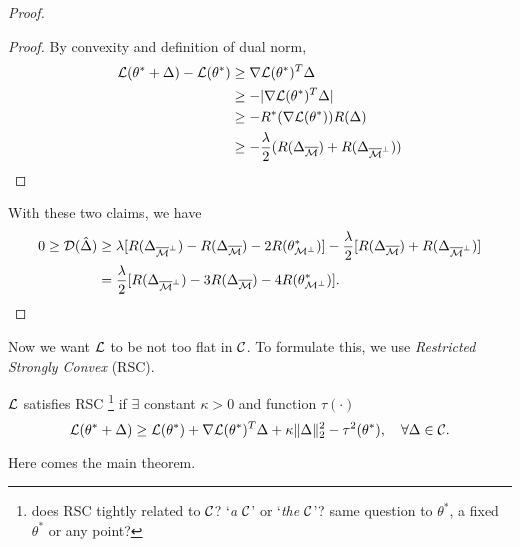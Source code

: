 \begin{proof}
    \begin{proof}
        By convexity and definition of dual norm,
        \begin{align}
            \mathcal{L}(\theta^*+\Delta)-\mathcal{L}(\theta^*) & \ge \nabla\mathcal{L}(\theta^*)^T\Delta \\
                & \ge-|\nabla\mathcal{L}(\theta^*)^T\Delta| \\
                & \ge -R^*(\nabla\mathcal{L}(\theta^*))R(\Delta)    \\
                & \ge -\frac{\lambda}{2}(R(\Delta_{{\overline{\mathcal{M}}}})+R(\Delta_{{\overline{\mathcal{M}}}^\perp}))
        \end{align}
    \end{proof}

    With these two claims, we have
    \begin{equation}
    \begin{split}
    0 \ge \mathcal{D}({\hat\Delta}) & \ge \lambda[R(\Delta_{{\overline{\mathcal{M}}}^\perp})-R(\Delta_{{\overline{\mathcal{M}}}})-2R(\theta^*_{\mathcal{M}^\perp})]
        -\frac{\lambda}{2}[R(\Delta_{{\overline{\mathcal{M}}}})+R(\Delta_{{\overline{\mathcal{M}}}^\perp})]  \\
    & = \frac{\lambda}{2}[R(\Delta_{{\overline{\mathcal{M}}}^\perp})-3R(\Delta_{{\overline{\mathcal{M}}}})-4R(\theta^*_{\mathcal{M}^\perp})].
    \end{split}
    \end{equation}
\end{proof}

Now we want $\mathcal{L}$ to be not too flat in $\mathcal{C}$.
To formulate this, we use \emph{Restricted Strongly Convex} (RSC).

\begin{define}
    $\mathcal{L}$ satisfies RSC
    \footnote{does RSC tightly related to $\mathcal{C}$? \ie `\emph{a} $\mathcal{C}$' or `\emph{the} $\mathcal{C}$'?
    same question to $\theta^*$, a fixed $\theta^*$ or any point?}
    if $\exists$ constant $\kappa > 0$ and function $\tau(\cdot)$
    \st
    \begin{equation}
        \mathcal{L}(\theta^*+\Delta)\ge \mathcal{L}(\theta^*) + \nabla \mathcal{L}(\theta^*)^T\Delta + \kappa\|\Delta\|_2^2-\tau^2(\theta^*),\quad \forall \Delta\in\mathcal{C}.
    \end{equation}
\end{define}

Here comes the main theorem.

